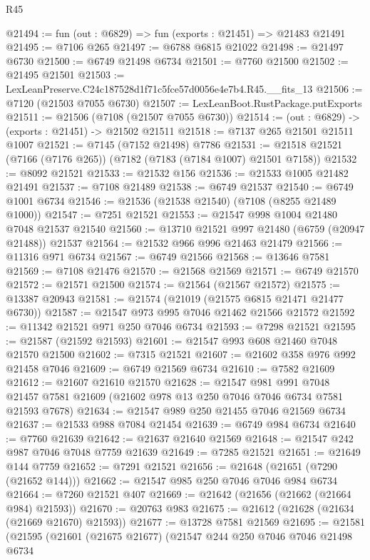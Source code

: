 \begin{lexlean}{R45}
\begin{coremodule}
{@21494 := fun (out : @6829) => fun (exports : @21451) => @21483 @21491
@21495 := @7106 @265
@21497 := @6788 @6815 @21022
@21498 := @21497 @6730
@21500 := @6749 @21498 @6734
@21501 := @7760 @21500
@21502 := @21495 @21501
@21503 := LexLeanPreserve.C24c187528d1f71c5fce57d0056e4e7b4.R45.__fits_13
@21506 := @7120 (@21503 @7055 @6730)
@21507 := LexLeanBoot.RustPackage.putExports
@21511 := @21506 (@7108 (@21507 @7055 @6730))
@21514 := (out : @6829) -> (exports : @21451) -> @21502 @21511
@21518 := @7137 @265 @21501 @21511 @1007
@21521 := @7145 (@7152 @21498) @7786
@21531 := @21518 @21521 (@7166 (@7176 @265)) (@7182 (@7183 (@7184 @1007) @21501 @7158))
@21532 := @8092 @21521
@21533 := @21532 @156
@21536 := @21533 @1005 @21482 @21491
@21537 := @7108 @21489
@21538 := @6749 @21537
@21540 := @6749 @1001 @6734
@21546 := @21536 (@21538 @21540) (@7108 (@8255 @21489 @1000))
@21547 := @7251 @21521
@21553 := @21547 @998 @1004 @21480 @7048 @21537 @21540
@21560 := @13710 @21521 @997 @21480 (@6759 (@20947 @21488)) @21537
@21564 := @21532 @966 @996 @21463 @21479
@21566 := @11316 @971 @6734
@21567 := @6749 @21566
@21568 := @13646 @7581
@21569 := @7108 @21476
@21570 := @21568 @21569
@21571 := @6749 @21570
@21572 := @21571 @21500
@21574 := @21564 (@21567 @21572)
@21575 := @13387 @20943
@21581 := @21574 (@21019 (@21575 @6815 @21471 @21477 @6730))
@21587 := @21547 @973 @995 @7046 @21462 @21566 @21572
@21592 := @11342 @21521 @971 @250 @7046 @6734
@21593 := @7298 @21521
@21595 := @21587 (@21592 @21593)
@21601 := @21547 @993 @608 @21460 @7048 @21570 @21500
@21602 := @7315 @21521
@21607 := @21602 @358 @976 @992 @21458 @7046
@21609 := @6749 @21569 @6734
@21610 := @7582 @21609
@21612 := @21607 @21610 @21570
@21628 := @21547
    @981
    @991
    @7048
    @21457
    @7581
    @21609
    (@21602 @978 @13 @250 @7046 @7046 @6734 @7581 @21593 @7678)
@21634 := @21547 @989 @250 @21455 @7046 @21569 @6734
@21637 := @21533 @988 @7084 @21454
@21639 := @6749 @984 @6734
@21640 := @7760 @21639
@21642 := @21637 @21640 @21569
@21648 := @21547 @242 @987 @7046 @7048 @7759 @21639
@21649 := @7285 @21521
@21651 := @21649 @144 @7759
@21652 := @7291 @21521
@21656 := @21648 (@21651 (@7290 (@21652 @144)))
@21662 := @21547 @985 @250 @7046 @7046 @984 @6734
@21664 := @7260 @21521 @407
@21669 := @21642 (@21656 (@21662 (@21664 @984) @21593))
@21670 := @20763 @983
@21675 := @21612 (@21628 (@21634 (@21669 @21670) @21593))
@21677 := @13728 @7581 @21569
@21695 := @21581
    (@21595
      (@21601
        (@21675 @21677)
        (@21547
          @244
          @250
          @7046
          @7046
          @21498
          @6734
}
\end{coremodule}
\end{lexlean}
